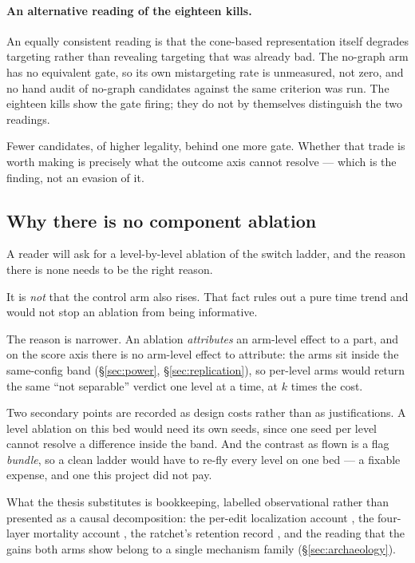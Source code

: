 \paragraph{An alternative reading of the eighteen kills.} An equally
consistent reading is that the cone-based representation itself degrades
targeting rather than revealing targeting that was already bad. The
no-graph arm has no equivalent gate, so its own mistargeting rate is
unmeasured, not zero, and no hand audit of no-graph candidates against the
same criterion was run. The eighteen kills show the gate firing; they do
not by themselves distinguish the two readings.

Fewer candidates, of higher legality, behind one more gate. Whether that
trade is worth making is precisely what the outcome axis cannot resolve ---
which is the finding, not an evasion of it.

\subsection*{Why there is no component ablation}

A reader will ask for a level-by-level ablation of the switch ladder, and
the reason there is none needs to be the right reason.

It is \emph{not} that the control arm also rises. That fact rules out a
pure time trend and would not stop an ablation from being informative.

The reason is narrower. An ablation \emph{attributes} an arm-level effect
to a part, and on the score axis there is no arm-level effect to attribute:
the arms sit inside the same-config band (\S\ref{sec:power},
\S\ref{sec:replication}), so per-level arms would return the same ``not
separable'' verdict one level at a time, at $k$ times the cost.

Two secondary points are recorded as design costs rather than as
justifications. A level ablation on this bed would need its own seeds,
since one seed per level cannot resolve a difference inside the band. And
the contrast as flown is a flag \emph{bundle}, so a clean ladder would have
to re-fly every level on one bed --- a fixable expense, and one this
project did not pay.

What the thesis substitutes is bookkeeping, labelled  observational
rather than presented as a causal decomposition: the per-edit localization
account , the four-layer mortality account , the
ratchet's retention record , and the reading that the gains both arms
show belong to a single mechanism family (\S\ref{sec:archaeology}).

